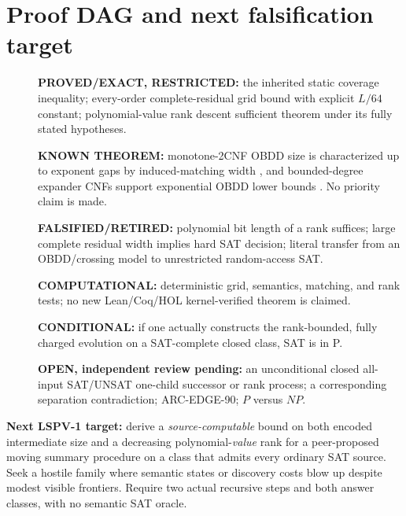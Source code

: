 \documentclass[11pt]{article}
\begin{document}
\section{Proof DAG and next falsification target}
\begin{description}
\item[] \textbf{PROVED/EXACT, RESTRICTED:} the inherited static coverage inequality; every-order complete-residual grid bound with explicit $L/64$ constant; polynomial-value rank descent sufficient theorem under its fully stated hypotheses.
\item[] \textbf{KNOWN THEOREM:} monotone-2CNF OBDD size is characterized up to exponent gaps by induced-matching width \cite{razgon21}, and bounded-degree expander CNFs support exponential OBDD lower bounds \cite{bova17}. No priority claim is made.
\item[] \textbf{FALSIFIED/RETIRED:} polynomial bit length of a rank suffices; large complete residual width implies hard SAT decision; literal transfer from an OBDD/crossing model to unrestricted random-access SAT.
\item[] \textbf{COMPUTATIONAL:} deterministic grid, semantics, matching, and rank tests; no new Lean/Coq/HOL kernel-verified theorem is claimed.
\item[] \textbf{CONDITIONAL:} if one actually constructs the rank-bounded, fully charged evolution on a SAT-complete closed class, SAT is in P.
\item[] \textbf{OPEN, independent review pending:} an unconditional closed all-input SAT/UNSAT one-child successor or rank process; a corresponding separation contradiction; ARC-EDGE-90; $P$ versus $NP$.
\end{description}
\noindent \textbf{Next LSPV-1 target:} derive a \emph{source-computable} bound on both encoded intermediate size and a decreasing polynomial-\emph{value} rank for a peer-proposed moving summary procedure on a class that admits every ordinary SAT source. Seek a hostile family where semantic states or discovery costs blow up despite modest visible frontiers. Require two actual recursive steps and both answer classes, with no semantic SAT oracle.



\end{document}
